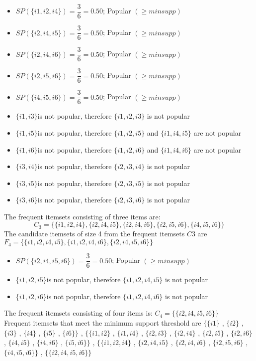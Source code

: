 \begin{itemize}
\item \(SP(\{i1,i2,i4\})=\dfrac{3}{6}=0.50\); Popular  \((\geq minsupp)\)
\item \(SP(\{i2,i4,i5\})=\dfrac{3}{6}=0.50\); Popular \((\geq minsupp)\)
\item \(SP(\{i2,i4,i6\})=\dfrac{3}{6}=0.50\); Popular \((\geq minsupp)\)
\item \(SP(\{i2,i5,i6\})=\dfrac{3}{6}=0.50\); Popular \((\geq minsupp)\)
\item \(SP(\{i4,i5,i6\})=\dfrac{3}{6}=0.50\); Popular  \((\geq minsupp)\)
\item \(\{i1,i3\}\)is not popular, therefore \(\{i1, i2, i3\}\) is not popular
\item \(\{i1,i5\}\)is not popular, therefore \(\{i1, i2, i5\}\) and \(\{i1, i4, i5\}\) are not popular
\item \(\{i1,i6\}\)is not popular, therefore \(\{i1, i2, i6\}\) and \(\{i1, i4, i6\}\) are not popular
\item \(\{i3,i4\}\)is not popular, therefore \(\{i2, i3, i4\}\) is not popular
\item \(\{i3,i5\}\)is not popular, therefore \(\{i2, i3, i5\}\) is not popular
\item \(\{i3,i6\}\)is not popular, therefore \(\{i2, i3, i6\}\) is not popular
\end{itemize}
The frequent itemsets consisting of three items are: \[C_3=\{\{i1,i2,i4\},\{i2,i4,i5\},\{i2,i4,i6\},\{i2,i5,i6\},\{i4,i5,i6\}\}\]
The candidate itemsets of size 4 from the frequent itemsets \(C3\) are\\ \(F_4=\{\{i1,i2,i4,i5\},\{i1,i2,i4,i6\},\{i2,i4,i5,i6\}\}\)
\begin{itemize}
\item \(SP(\{i2,i4,i5,i6\})=\dfrac{3}{6}=0.50\); Popular  \((\geq minsupp)\)
\item \(\{i1,i2,i5\}\)is not popular, therefore \(\{i1, i2, i4, i5\}\) is not popular
\item \(\{i1,i2,i6\}\)is not popular, therefore \(\{i1, i2, i4, i6\}\) is not popular
\end{itemize}
The frequent itemsets consisting of four items is: \(C_4=\{\{i2,i4,i5,i6\}\}\)\\
Frequent itemsets that meet the minimum support threshold are \(\{\{i1\}\) , \(\{i2\}\) , \(\{i3\}\) , \(\{i4\}\) , \(\{i5\}\) , \(\{i6\}\}\) , \(\{\{i1,i2\}\) , \(\{i1,i4\}\) , \(\{i2,i3\}\) , \(\{i2,i4\}\) , \(\{i2,i5\}\) , \(\{i2,i6\}\) , \(\{i4,i5\}\) , \(\{i4,i6\}\) , \(\{i5,i6\}\}\) , \(\{\{i1,i2,i4\}\) , \(\{i2,i4,i5\}\) , \(\{i2,i4,i6\}\) , \(\{i2,i5,i6\}\) , \(\{i4,i5,i6\}\}\) , \(\{\{i2,i4,i5,i6\}\}\)
